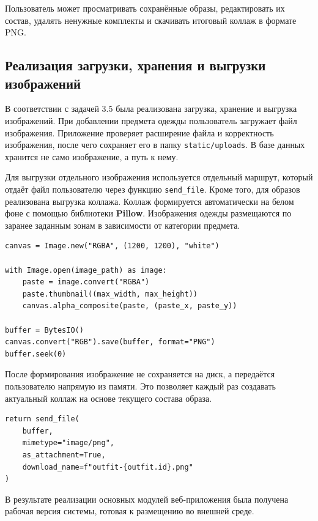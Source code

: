 Пользователь может просматривать сохранённые образы, редактировать их состав, удалять ненужные комплекты и скачивать итоговый коллаж в формате PNG.

\subsection{Реализация загрузки, хранения и выгрузки изображений}

В соответствии с задачей 3.5 была реализована загрузка, хранение и выгрузка изображений. При добавлении предмета одежды пользователь загружает файл изображения. Приложение проверяет расширение файла и корректность изображения, после чего сохраняет его в папку \texttt{static/uploads}. В базе данных хранится не само изображение, а путь к нему.

Для выгрузки отдельного изображения используется отдельный маршрут, который отдаёт файл пользователю через функцию \texttt{send\_file}. Кроме того, для образов реализована выгрузка коллажа. Коллаж формируется автоматически на белом фоне с помощью библиотеки \textbf{Pillow}. Изображения одежды размещаются по заранее заданным зонам в зависимости от категории предмета.
\newpage

\begin{lstlisting}[caption={Создание PNG-коллажа образа}, label={lst:collage}]
canvas = Image.new("RGBA", (1200, 1200), "white")

with Image.open(image_path) as image:
    paste = image.convert("RGBA")
    paste.thumbnail((max_width, max_height))
    canvas.alpha_composite(paste, (paste_x, paste_y))

buffer = BytesIO()
canvas.convert("RGB").save(buffer, format="PNG")
buffer.seek(0)
\end{lstlisting}

После формирования изображение не сохраняется на диск, а передаётся пользователю напрямую из памяти. Это позволяет каждый раз создавать актуальный коллаж на основе текущего состава образа.

\begin{lstlisting}[caption={Выгрузка коллажа пользователю}, label={lst:export_collage}]
return send_file(
    buffer,
    mimetype="image/png",
    as_attachment=True,
    download_name=f"outfit-{outfit.id}.png"
)
\end{lstlisting}

В результате реализации основных модулей веб-приложения была получена рабочая версия системы, готовая к размещению во внешней среде.

